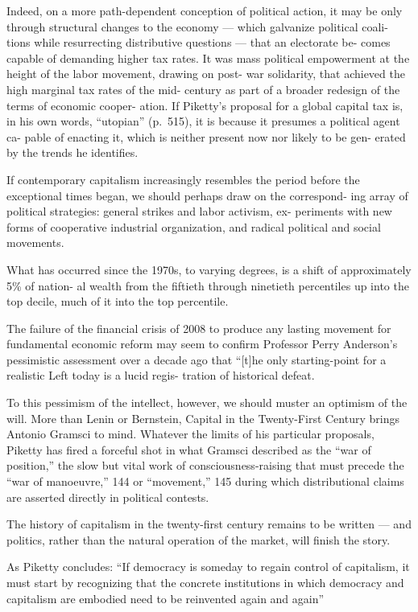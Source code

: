 \documentclass[
]{book}
\begin{document}
Indeed, on a more
path-dependent conception of political action, it may be only through
structural changes to the economy --- which galvanize political coali-
tions while resurrecting distributive questions --- that an electorate be-
comes capable of demanding higher tax rates. It was mass political
empowerment at the height of the labor movement, drawing on post-
war solidarity, that achieved the high marginal tax rates of the mid-
century as part of a broader redesign of the terms of economic cooper-
ation. If Piketty's proposal for a global capital tax is, in his own
words, ``utopian'' (p.~515), it is because it presumes a political agent ca-
pable of enacting it, which is neither present now nor likely to be gen-
erated by the trends he identifies.

If
contemporary capitalism increasingly resembles the period before the
exceptional times began, we should perhaps draw on the correspond-
ing array of political strategies: general strikes and labor activism, ex-
periments with new forms of cooperative industrial organization, and
radical political and social movements.

What has occurred since
the 1970s, to varying degrees, is a shift of approximately 5\% of nation-
al wealth from the fiftieth through ninetieth percentiles up into the top
decile, much of it into the top percentile.

The failure of the financial crisis of 2008 to produce any lasting
movement for fundamental economic reform may seem to confirm
Professor Perry Anderson's pessimistic assessment over a decade ago
that ``{[}t{]}he only starting-point for a realistic Left today is a lucid regis-
tration of historical defeat.

To this pessimism of the intellect, however, we
should muster an optimism of the will. More than Lenin or Bernstein,
Capital in the Twenty-First Century brings Antonio Gramsci to mind.
Whatever the limits of his particular proposals, Piketty has fired a
forceful shot in what Gramsci described as the ``war of position,'' the
slow but vital work of consciousness-raising that must precede the
``war of manoeuvre,'' 144 or ``movement,'' 145 during which distributional
claims are asserted directly in political contests.

The history of capitalism in the twenty-first century remains to
be written --- and politics, rather than the natural operation of the
market, will finish the story.

As Piketty concludes: ``If democracy is
someday to regain control of capitalism, it must start by recognizing
that the concrete institutions in which democracy and capitalism are
embodied need to be reinvented again and again''
\end{document}

